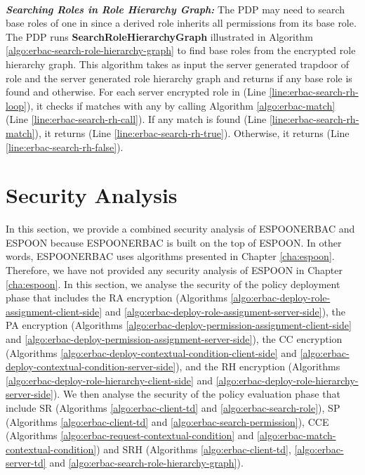 \documentclass[epsfig,a4paper,11pt,titlepage]{book}
\numberwithin{algorithm}{chapter}
\begin{document}
\noindent \\
\noindent \emph{\textbf{Searching Roles in Role Hierarchy Graph:}}
The \gls{PDP} may need to search base roles of one in  since a derived role inherits all permissions from its base role. The \gls{PDP} runs \textbf{SearchRoleHierarchyGraph} illustrated in Algorithm \ref{algo:erbac-search-role-hierarchy-graph} to find base roles from the encrypted role hierarchy graph. This algorithm takes as input the server generated trapdoor of role  and the server generated role hierarchy graph  and returns  if any base role is found and  otherwise. For each server encrypted role  in  (Line \ref{line:erbac-search-rh-loop}), it checks if  matches with any  by calling Algorithm \ref{algo:erbac-match} (Line \ref{line:erbac-search-rh-call}). If any match is found (Line \ref{line:erbac-search-rh-match}), it returns  (Line \ref{line:erbac-search-rh-true}). Otherwise, it returns  (Line \ref{line:erbac-search-rh-false}).

\section{Security Analysis}
\label{sec:erbac-security-analysis} 
In this section, we provide a combined security analysis of \gls{ESPOONERBAC} and \gls{ESPOON} because \gls{ESPOONERBAC} is built on the top of \gls{ESPOON}. In other words, \gls{ESPOONERBAC} uses algorithms presented in Chapter \ref{cha:espoon}. Therefore, we have not provided any security analysis of \gls{ESPOON} in Chapter \ref{cha:espoon}. In this section, we analyse the security of the policy deployment phase that includes the \gls{RA} encryption (Algorithms \ref{algo:erbac-deploy-role-assignment-client-side} and \ref{algo:erbac-deploy-role-assignment-server-side}), the \gls{PA} encryption (Algorithms \ref{algo:erbac-deploy-permission-assignment-client-side} and \ref{algo:erbac-deploy-permission-assignment-server-side}), the \gls{CC} encryption (Algorithms \ref{algo:erbac-deploy-contextual-condition-client-side} and \ref{algo:erbac-deploy-contextual-condition-server-side}), and the \gls{RH} encryption (Algorithms \ref{algo:erbac-deploy-role-hierarchy-client-side} and \ref{algo:erbac-deploy-role-hierarchy-server-side}). We then analyse the security of the policy evaluation phase that include \gls{SR} (Algorithms \ref{algo:erbac-client-td} and \ref{algo:erbac-search-role}), \gls{SP} (Algorithms \ref{algo:erbac-client-td} and \ref{algo:erbac-search-permission}), \gls{CCE} (Algorithms \ref{algo:erbac-request-contextual-condition} and \ref{algo:erbac-match-contextual-condition}) and \gls{SRH} (Algorithms \ref{algo:erbac-client-td}, \ref{algo:erbac-server-td} and \ref{algo:erbac-search-role-hierarchy-graph}). 
\end{document}
